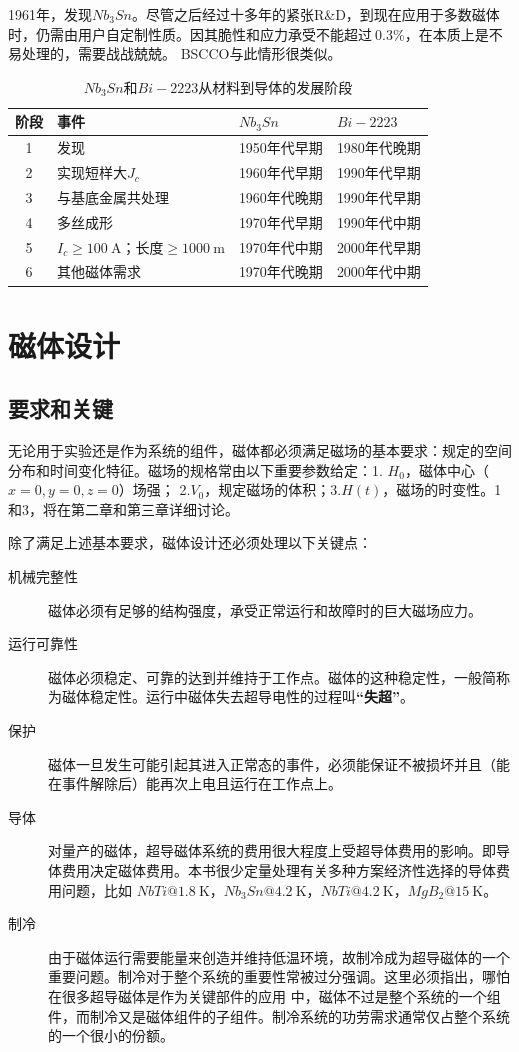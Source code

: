 1961年，发现$Nb_3Sn$。尽管之后经过十多年的紧张R\&D，到现在应用于多数磁体时，仍需由用户自定制性质。因其脆性和应力承受不能超过$~0.3\%$，在本质上是不易处理的，需要战战兢兢。
BSCCO与此情形很类似。
\begin{table}[htbp]\small
  \centering
  \caption{$Nb_3Sn$和$Bi-2223$从材料到导体的发展阶段} \label{scstage}
\begin{tabular}{|c||l|l|l|}
  \hline
  阶段&事件& $Nb_3Sn$ &$Bi-2223$ \\ \hline \hline
1 & 发现 & 1950年代早期& 1980年代晚期 \\ \hline
2 & 实现短样大$J_c$ & 1960年代早期 & 1990年代早期\\ \hline
3 &与基底金属共处理&1960年代晚期&1990年代早期\\ \hline
4 &多丝成形&1970年代早期&1990年代中期\\ \hline
5 &$I_c\ge 100\ \mathrm{A}$；长度$\ge 1000\ \mathrm{m}$ &1970年代中期&2000年代早期\\ \hline
6 &其他磁体需求&1970年代晚期&2000年代中期\\
  \hline
\end{tabular}
\end{table}


\section{磁体设计}
\subsection{要求和关键}
无论用于实验还是作为系统的组件，磁体都必须满足磁场的基本要求：规定的空间分布和时间变化特征。磁场的规格常由以下重要参数给定：1. $H_0$，磁体中心（$x=0, y=0, z=0$）场强；
2.$V_0$，规定磁场的体积；3.$H(t)$，磁场的时变性。1和3，将在第二章和第三章详细讨论。

除了满足上述基本要求，磁体设计还必须处理以下关键点：
\begin{description}
  \item[机械完整性] 磁体必须有足够的结构强度，承受正常运行和故障时的巨大磁场应力。
  \item[运行可靠性] 磁体必须稳定、可靠的达到并维持于工作点。磁体的这种稳定性，一般简称为磁体稳定性。运行中磁体失去超导电性的过程叫\textbf{“失超”}。
  \item[保护] 磁体一旦发生可能引起其进入正常态的事件，必须能保证不被损坏并且（能在事件解除后）能再次上电且运行在工作点上。
  \item[导体] 对量产的磁体，超导磁体系统的费用很大程度上受超导体费用的影响。即导体费用决定磁体费用。本书很少定量处理有关多种方案经济性选择的导体费用问题，比如
$NbTi@1.8\ \mathrm{K}$，$Nb_3Sn@4.2\ \mathrm{K}$，$NbTi@4.2\ \mathrm{K}$，$MgB_2@15\ \mathrm{K}$。
  \item[制冷] 由于磁体运行需要能量来创造并维持低温环境，故制冷成为超导磁体的一个重要问题。制冷对于整个系统的重要性常被过分强调。这里必须指出，哪怕在很多超导磁体是作为关键部件的应用
  中，磁体不过是整个系统的一个组件，而制冷又是磁体组件的子组件。制冷系统的功劳需求通常仅占整个系统的一个很小的份额。
\end{description}

